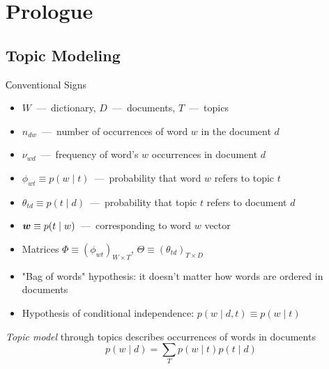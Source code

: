 \documentclass[russian]{beamer}
\begin{document}
\section{Prologue}


\subsection{Topic Modeling}


\begin{frame}{Сonventional Signs}
  \begin{itemize}
    \item $W$~---~dictionary, $D$~---~documents, $T$~---~topics
    \item $n_{dw}$~---~number of occurrences of word $w$ in the document $d$
    \item $\nu_{wd}$~---~frequency of word's $w$ occurrences in document $d$
    \item $\phi_{wt} \equiv p(w \mid t)$~---~probability that word $w$ refers to topic $t$ %
    \item $\theta_{td} \equiv p(t \mid d)$~---~probability that topic $t$ refers to document $d$
    \item $\boldsymbol w \equiv p(t \mid w)$~---~corresponding to word $w$ vector
    \item Matrices $\Phi \equiv (\phi_{wt})_{W \times T}$, $\Theta \equiv (\theta_{td})_{T \times D}$
    \item "Bag of words" hypothesis: it doesn't matter how words are ordered in documents
    \item Hypothesis of conditional independence: $p(w \mid d, t) \equiv p(w \mid t)$
  \end{itemize}
  
  \emph{Topic model} through topics describes occurrences of words in documents
  \[
     p(w \mid d) = \sum\limits_{T} p(w \mid t) p(t \mid d)
  \]
\end{frame}
\end{document}
